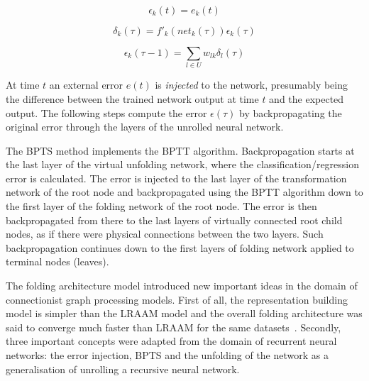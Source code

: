\begin{equation}
\epsilon_k(t) = e_k(t)
\label{eq:bptt_epsilon}
\end{equation}

\begin{equation}
\delta_k(\tau) = f'_k(net_k(\tau))\epsilon_k(\tau)
\label{eq:bptt_delta}
\end{equation}

\begin{equation}
\epsilon_k(\tau - 1) = \sum_{l \in U} w_{lk} \delta_l(\tau)
\label{eq:bptt_summaric}
\end{equation}

\noindent At time $t$ an external error $e(t)$ is \emph{injected} to the network, presumably being the difference between the trained network output at time $t$ and the expected output. The following steps compute the error $\epsilon(\tau)$ by backpropagating the original error through the layers of the unrolled neural network.

The BPTS method implements the BPTT algorithm. Backpropagation starts at the last layer of the virtual unfolding network, where the classification/regression error is calculated. The error is injected to the last layer of the transformation network of the root node and backpropagated using the BPTT algorithm down to the first layer of the folding network of the root node. The error is then backpropagated from there to the last layers of virtually connected root child nodes, as if there were physical connections between the two layers. Such backpropagation continues down to the first layers of folding network applied to terminal nodes (leaves).

The folding architecture model introduced new important ideas in the domain of connectionist graph processing models. First of all, the representation building model is simpler than the LRAAM model and the overall folding architecture was said to converge much faster than LRAAM for the same datasets~\cite{goller1996learning}. Secondly, three important concepts were adapted from the domain of recurrent neural networks: the error injection, BPTS and the unfolding of the network as a generalisation of unrolling a recursive neural network.
